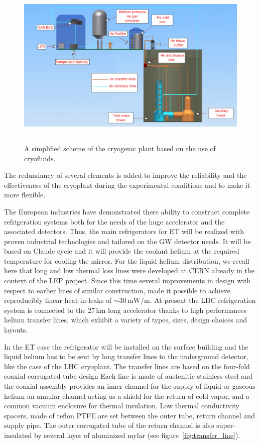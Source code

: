 \FloatBarrier
\begin{figure}[htbp]
\begin{center}
\includegraphics[width=14cm, height=8cm]{./Sec_SiteInfra/Figures/He_plant_n.pdf}
\caption{A simplified scheme of the cryogenic plant based on the use of cryofluids.}
\label{fig:He_plant}
\end{center}
\end{figure}


 The redundancy of several elements is added to improve the reliability and the effectiveness of the cryoplant during the experimental conditions and to make it more flexible. 

 The European  industries have demonstrated there ability to construct 
complete  refrigeration systems both  for the needs of the huge accelerator and the associated detectors. 
Thus, the main refrigerators for ET will be realized with proven industrial technologies and tailored on the GW detector needs. It will be  based on Claude cycle and it will provide the coolant helium at the required temperature for cooling the mirror. 
For the liquid helium distribution, we recall here that  long and low thermal loss lines were developed at CERN already in the context of the LEP project. Since this time several improvements in design with respect to earlier lines of similar construction, made it possible to  achieve reproducibly linear heat in-leaks of $\sim 30\,\mathrm{mW/m}$.  At present the  LHC refrigeration system is connected to the 27\,km long accelerator thanks to  high performances helium transfer lines, which exhibit a variety of types, sizes, design choices and layouts. 

In the ET case the refrigerator will be installed on the surface building and the liquid helium has to be sent by  long transfer lines to the underground detector,  like  the case of  the LHC cryoplant. The transfer lines are based on the four-fold coaxial corrugated tube design Each line is made of austenitic stainless steel and the coaxial assembly provides an inner channel  for the supply of liquid or gaseous helium an annular channel acting as a shield for the return of cold vapor, and a common vacuum enclosure for thermal insulation. Low thermal conductivity spacers, made of teflon PTFE are set between the outer tube, return channel and supply pipe. The outer corrugated tube of the return channel is also super-insulated by several layer of aluminized mylar (see figure~\ref{fig:transfer_line}).

